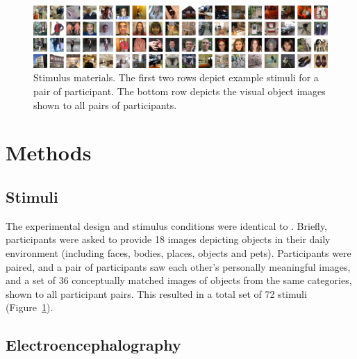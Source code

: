 \documentclass[10pt,letterpaper]{article}
\begin{document}
\begin{figure}[t]
\begin{center}
\includegraphics[width=\linewidth]{figures/figure1_smaller.png}
\end{center}
\caption{
  Stimulus materials. The first two rows depict example 
  stimuli for a pair of participant. The bottom row depicts the 
  visual object images shown to all pairs of participants.
} 
\label{fig1}
\end{figure}

\section{Methods}

\subsection{Stimuli}

The experimental design and stimulus conditions were identical to 
\cite{Charest2014-zn}. Briefly, participants were asked to provide 
18 images depicting objects in their daily environment (including 
faces, bodies, places, objects and pets). Participants were paired, 
and a pair of participants saw each other’s personally meaningful 
images, and a set of 36 conceptually matched images of objects from 
the same categories, shown to all participant pairs. This resulted 
in a total set of 72 stimuli (Figure~\ref{fig1}).


\subsection{Electroencephalography}
\end{document}

